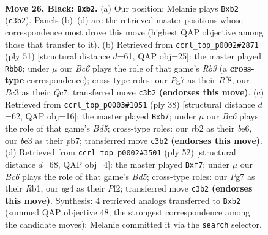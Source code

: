 \documentclass[11pt]{article}
\begin{document}
\clearpage

\begin{figure}[p]\centering
\begin{subfigure}{0.46\textwidth}\centering
\resizebox{\linewidth}{!}{%
\newchessgame
\chessboard[
  setfen={r7/2p2kpp/3p4/8/pP4Q1/2bqB3/PR3PPP/6K1 b - - 1 26},
  showmover=false,
  pgfstyle=straightmove, color=movearrow, markmove={c3-b2}
]}
\caption{}
\end{subfigure}\hfill
\begin{subfigure}{0.46\textwidth}\centering
\resizebox{\linewidth}{!}{%
\newchessgame
\chessboard[
  setfen={5r1k/2q2p1p/1rBp2p1/1P2p3/Q3P3/3R3P/1P3PP1/6K1 b - - 1 26},
  showmover=false,
  pgfstyle=straightmove, color=movearrow, markmove={b6-b8}
]}
\caption{}
\end{subfigure}
\\[4pt]
\begin{subfigure}{0.46\textwidth}\centering
\resizebox{\linewidth}{!}{%
\newchessgame
\chessboard[
  setfen={r5k1/1p3ppp/4b3/p2B4/P2Q4/3P4/1PP3Pq/R4K2 w - - 1 20},
  showmover=false,
  pgfstyle=straightmove, color=movearrow, markmove={d5-b7}
]}
\caption{}
\end{subfigure}\hfill
\begin{subfigure}{0.46\textwidth}\centering
\resizebox{\linewidth}{!}{%
\newchessgame
\chessboard[
  setfen={7k/3q1ppp/1r1p4/3Bp3/1b2P3/5Q1P/5PP1/1R4K1 w - - 2 27},
  showmover=false,
  pgfstyle=straightmove, color=movearrow, markmove={d5-f7}
]}
\caption{}
\end{subfigure}
\caption{\textbf{Move 26, Black: \texttt{Bxb2}.} (a) Our position; Melanie plays \texttt{Bxb2} (\texttt{c3b2}). Panels (b)--(d) are the retrieved master positions whose correspondence most drove this move (highest QAP objective among those that transfer to it). (b) Retrieved from \texttt{ccrl\_top\_p0002\#2871} (ply 51) [structural distance $d$=61, QAP obj=25]: the master played \texttt{Rbb8}; under $\mu$ our \emph{Bc6} plays the role of that game's \emph{Rb3} (a \textbf{cross-type} correspondence); cross-type roles: our \emph{P}g7 as their \emph{R}f8, our \emph{B}c3 as their \emph{Q}c7; transferred move \texttt{c3b2} \textbf{(endorses this move)}. (c) Retrieved from \texttt{ccrl\_top\_p0003\#1051} (ply 38) [structural distance $d$=62, QAP obj=16]: the master played \texttt{Bxb7}; under $\mu$ our \emph{Bc6} plays the role of that game's \emph{Bd5}; cross-type roles: our \emph{r}b2 as their \emph{b}e6, our \emph{b}e3 as their \emph{p}b7; transferred move \texttt{c3b2} \textbf{(endorses this move)}. (d) Retrieved from \texttt{ccrl\_top\_p0002\#3501} (ply 52) [structural distance $d$=68, QAP obj=4]: the master played \texttt{Bxf7}; under $\mu$ our \emph{Bc6} plays the role of that game's \emph{Bd5}; cross-type roles: our \emph{P}g7 as their \emph{R}b1, our \emph{q}g4 as their \emph{P}f2; transferred move \texttt{c3b2} \textbf{(endorses this move)}. Synthesis: 4 retrieved analogs transferred to \texttt{Bxb2} (summed QAP objective 48, the strongest correspondence among the candidate moves); Melanie committed it via the \texttt{search} selector.}
\label{fig:thought-m51}
\end{figure}
\end{document}
